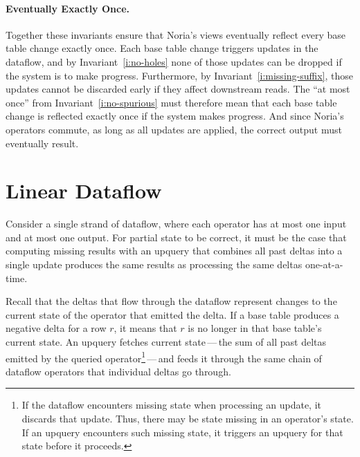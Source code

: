 \paragraph{Eventually Exactly Once.}
Together these invariants ensure that Noria's views eventually reflect every
base table change exactly once. Each base table change triggers updates in the
dataflow, and by Invariant~\ref{i:no-holes} none of those updates can be dropped
if the system is to make progress. Furthermore, by
Invariant~\ref{i:missing-suffix}, those updates cannot be discarded early if
they affect downstream reads. The ``at most once'' from
Invariant~\ref{i:no-spurious} must therefore mean that each base table change is
reflected exactly once if the system makes progress. And since Noria's operators
commute, as long as all updates are applied, the correct output must eventually
result.


\section{Linear Dataflow}
\label{s:partial:linear}

Consider a single strand of dataflow, where each operator has at most one input
and at most one output. For partial state to be correct, it must be the case
that computing missing results with an upquery that combines all past deltas
into a single update produces the same results as processing the same deltas
one-at-a-time.

Recall that the deltas that flow through the dataflow represent changes to the
current state of the operator that emitted the delta. If a base table produces
a negative delta for a row $r$, it means that $r$ is no longer in that base
table's current state. An upquery fetches current state\,---\,the sum of all
past deltas emitted by the queried operator\footnote{If the dataflow encounters
missing state when processing an update, it discards that update. Thus, there
may be state missing in an operator's state. If an upquery encounters such
missing state, it triggers an upquery for that state before it
proceeds.}\,---\,and feeds it through the same chain of dataflow operators that
individual deltas go through.

